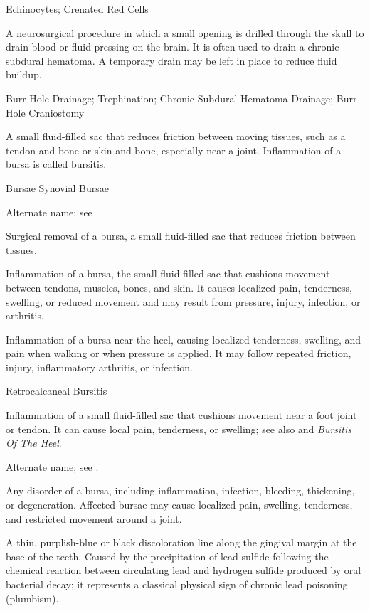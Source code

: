 \synonyms
Echinocytes; Crenated Red Cells

 A neurosurgical procedure in which a small
opening is drilled through the skull to drain blood or fluid pressing on the
brain. It is often used to drain a chronic subdural hematoma. A temporary
drain may be left in place to reduce fluid buildup.

\synonyms
Burr Hole Drainage; Trephination; Chronic Subdural Hematoma Drainage; Burr Hole Craniostomy

 A small fluid-filled sac that reduces friction between moving tissues, such as a tendon and bone or skin and bone, especially near a joint. Inflammation of a bursa is called bursitis.

\synonyms
Bursae
Synovial Bursae

 Alternate name; see .

 Surgical removal of a bursa, a small fluid-filled sac that reduces friction between tissues.

 Inflammation of a bursa, the small fluid-filled sac that cushions movement between tendons, muscles, bones, and skin. It causes localized pain, tenderness, swelling, or reduced movement and may result from pressure, injury, infection, or arthritis.

 Inflammation of a bursa near the heel, causing localized tenderness, swelling, and pain when walking or when pressure is applied. It may follow repeated friction, injury, inflammatory arthritis, or infection.

\synonyms
Retrocalcaneal Bursitis

 Inflammation of a small fluid-filled sac that cushions movement near a foot joint or tendon. It can cause local pain, tenderness, or swelling; see also  and \textit{Bursitis Of The Heel}.

 Alternate name; see .

 Any disorder of a bursa, including inflammation, infection, bleeding, thickening, or degeneration. Affected bursae may cause localized pain, swelling, tenderness, and restricted movement around a joint.

 A thin, purplish-blue or black discoloration line along the gingival margin at the base of the teeth. Caused by the precipitation of lead sulfide following the chemical reaction between circulating lead and hydrogen sulfide produced by oral bacterial decay; it represents a classical physical sign of chronic lead poisoning (plumbism).


